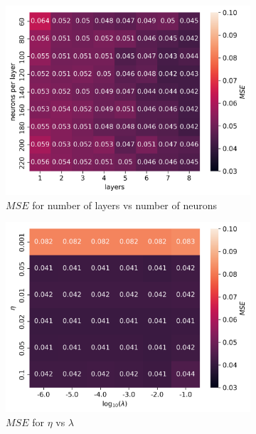 \documentclass[11pt]{article}
\begin{document}
\begin{figure}[H]
  \begin{subfigure}{.5\textwidth}
    \centering
    \includegraphics[width=\textwidth]{../figures/franke_L_n_test_relu_MSE.png}
    \caption{$MSE$ for number of layers vs number of neurons}
    \label{fig:}
  \end{subfigure}
  \begin{subfigure}{.5\textwidth}
    \centering
    \includegraphics[width=\textwidth]{../figures/franke_eta_lmb_relu.png}
    \caption{$MSE$ for $\eta$ vs $\lambda$}
    \label{fig:}
  \end{subfigure}
  \begin{subfigure}{.5\textwidth}

\end{subfigure}
\end{figure}
\end{document}
